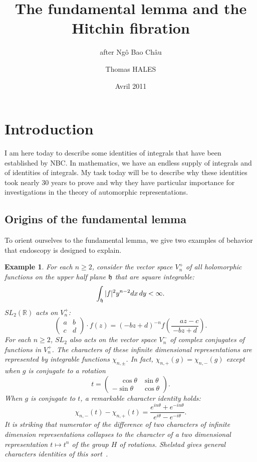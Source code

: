 \documentclass[brochure,english,12pt]{bourbaki}
\date{Avril 2011}
\title{The fundamental lemma and the Hitchin fibration}
\subtitle{after Ng\^o Bao Ch\^au}
\author{Thomas HALES}
\newtheorem{example}[equation]{Example}
\newcommand{\ring}[1]{\mathbb{#1}}
\begin{document}
\maketitle

{


}


\section{Introduction}


I am here today to describe some identities of integrals that have
been established by NBC.  In mathematics, we have an endless supply of
integrals and of identities of integrals.  My task today will be to
describe why these identities took nearly 30 years to prove and why
they have particular importance for investigations in the theory of
automorphic representations.






\subsection{Origins of the fundamental lemma}


To orient ourselves to the fundamental lemma, we give two examples of
behavior that endoscopy is designed to explain.


\begin{example}  For each $n\ge 2$, consider the vector space $V^+_n$
of all holomorphic functions on the upper half plane ${\frak h}$ that
are square integrable:
\[
\int_{\frak h} |f|^2 y^{n-2} dx\, dy < \infty.
\]
$SL_2(\ring{R})$ acts on $V^+_n$:
\[
\begin{pmatrix} a & b \\ c & d \end{pmatrix} \cdot f(z) = 
(-b z + d ) ^{-n} f (\frac{\phantom{-}a z - c}{-b z + d}).
\]
For each $n\ge 2$, $SL_2$ also acts on the vector space $V^-_n$ of complex
conjugates of functions in $V^+_n$.
The characters of these infinite dimensional representations are represented by integrable functions
$\chi_{n,\pm}$.  In fact, $\chi_{n,+}(g)=\chi_{n,-}(g)$ except when $g$ is conjugate to a rotation
\[
t = \begin{pmatrix} \phantom{-}\cos\theta & \sin\theta \\ -\sin\theta & \cos\theta\end{pmatrix}.
\] 
When $g$ is conjugate to $t$, a remarkable character identity holds:
\[
\chi_{n,-}(t) - \chi_{n,+}(t) = 
\frac{e^{i n \theta} + e^{- i n \theta}}{e^{i\theta}-e^{-i\theta}}.
\]
It is striking that numerator of the difference of two characters of
infinite dimension representations collapses to the character of a two
dimensional representation $t\mapsto t^n$ of the group $H$ of
rotations.  Shelstad gives general characters identities of this
sort~\cite{Sh}.
\end{example}
\end{document}
